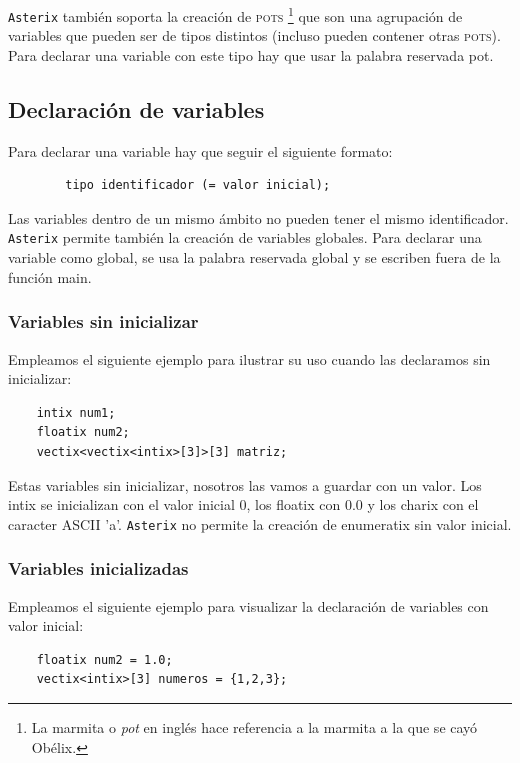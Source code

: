 \documentclass[a4paper, 10pt]{article}
\newcommand{\atx}{\texttt{Asterix} }
\begin{document}
    \atx también soporta la creación de \textsc{pots} \footnote{La marmita o
    \textit{pot} en inglés hace referencia a la marmita a la que se cayó
    Obélix.} que son una agrupación de variables que pueden ser de tipos
    distintos (incluso pueden contener otras \textsc{pots}). Para declarar una
    variable con este tipo hay que usar la palabra reservada \textsf{pot}.

    \subsection*{Declaración de variables}
    Para declarar una variable hay que seguir el siguiente formato: 
    \begin{verbatim}
        tipo identificador (= valor inicial);
    \end{verbatim}
    
    Las variables dentro de un mismo ámbito no pueden tener el mismo identificador. 
    \atx permite también la creación de variables globales. Para declarar una variable como 
    global, se usa la palabra reservada \textsf{global} y se escriben fuera de
    la función main. 

    \subsubsection*{Variables sin inicializar}
    Empleamos el siguiente ejemplo para ilustrar su uso cuando
    las declaramos sin inicializar:

    \begin{verbatim}
    intix num1;
    floatix num2;
    vectix<vectix<intix>[3]>[3] matriz;
    \end{verbatim}

    Estas variables sin inicializar, nosotros las vamos a guardar con un valor.
    Los intix se inicializan con el valor inicial 0, los floatix con 0.0 y los
    charix con el caracter ASCII 'a'. \atx no permite la creación de enumeratix
    sin valor inicial.
    
    \subsubsection*{Variables inicializadas}
    Empleamos el siguiente ejemplo para visualizar la declaración de variables
    con valor inicial:

    \begin{verbatim}
    floatix num2 = 1.0;
    vectix<intix>[3] numeros = {1,2,3};
    \end{verbatim}
\end{document}
